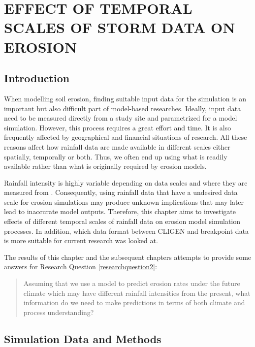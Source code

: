 \chapter{EFFECT OF TEMPORAL SCALES OF STORM DATA ON EROSION}
\label{sec:EFFECTSOFTEMPORALSCALESOFSTROMDATA}

\section{Introduction}
\label{sec:TemporalScalesEffectsIntroduction}

When modelling soil erosion, finding suitable input data for the simulation is
an important but also difficult part of model-based researches. Ideally, input
data need to be measured directly from a study site and parametrized for a model
simulation. However, this process requires a great effort and time. It is also
frequently affected by geographical and financial situations of research. All
these reasons affect how rainfall data are made available in different scales
either spatially, temporally or both. Thus, we often end up using what is
readily available rather than what is originally required by erosion models.

Rainfall intensity is highly variable depending on data scales and where they
are measured from \citep{nyssen2005-172}. Consequently, using rainfall data
that have a undesired data scale for erosion simulations may produce unknown
implications that may later lead to inaccurate model outputs. Therefore, this
chapter aims to investigate effects of different temporal scales of rainfall
data on erosion model simulation processes. In addition, which data format
between CLIGEN and breakpoint data is more suitable for current research was
looked at.

The results of this chapter and the subsequent chapters attempts to provide some
answers for Research Question \ref{researchquestion2}:\
\begin{quotation}
Assuming that we use a model to predict erosion rates under the future climate
which may have different rainfall intensities from the present, what information
do we need to make predictions in terms of both climate and process
understanding?                                                      
\end{quotation}

\section{Simulation Data and Methods}
\label{sec:TemporalScalesEffectsMethods}

